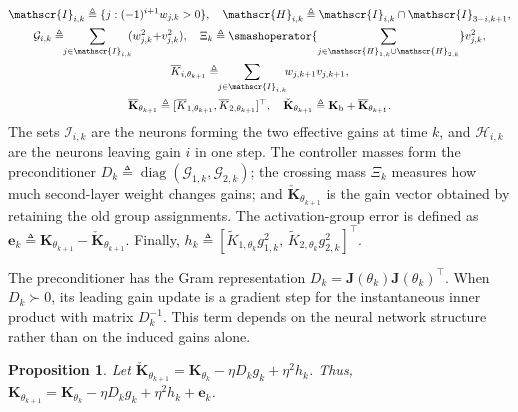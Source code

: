 \documentclass[letterpaper, 10 pt, conference]{ieeeconf}
\newcommand{\be}{\mathbf{e}}
\newcommand{\bJ}{\mathbf{J}}
\newcommand{\bK}{\mathbf{K}}
\newcommand{\cG}{\mathcal{G}}
\newcommand{\sI}{\mathscr{I}}
\newcommand{\sH}{\mathscr{H}}
\newtheorem{proposition}{Proposition}
\DeclareMathOperator*{\diag}{diag}
\begin{document}
\begin{gather} \label{eq_weight_defs}
    \sI_{i,k} \triangleq \{j : (-1)^{i+1}w_{j,k} > 0\},
    \quad
    \sH_{i,k} \triangleq \sI_{i,k} \cap \sI_{3-i,k+1},
    \\
    \cG_{i,k} \triangleq \!\!\sum_{j\in\sI_{i,k}}\!\! (w_{j,k}^{2}{+}v_{j,k}^{2}),
    \quad
    \Xi_{k} \triangleq \smashoperator{\sum_{j\in\sH_{1,k}\cup\sH_{2,k}}} v_{j,k}^{2},
    \\
    \overline{K}_{i,\theta_{k+1}} \triangleq \!\!\sum_{j\in\sI_{i,k}}\!\! w_{j,k+1}v_{j,k+1},
    \\
\overline{\bK}_{\theta_{k+1}}\triangleq
    [\overline K_{1,\theta_{k+1}},\overline K_{2,\theta_{k+1}}]^{\top},  \quad
    \check{\bK}_{\theta_{k+1}} \triangleq \bK_{\mathrm b} + \overline{\bK}_{\theta_{k+1}}.
\end{gather}
The sets $\sI_{i,k}$ are the neurons forming the two effective gains at time $k$, and $\sH_{i,k}$ are the neurons leaving gain $i$ in one step. The controller masses form the preconditioner $D_{k} \triangleq \diag(\cG_{1,k},\cG_{2,k})$; the crossing mass $\Xi_{k}$ measures how much second-layer weight changes gains; and $\check{\bK}_{\theta_{k+1}}$ is the gain vector obtained by retaining the old group assignments. The activation-group error is defined as $\be_{k} \triangleq \bK_{\theta_{k+1}} - \check{\bK}_{\theta_{k+1}}$. Finally, $h_{k} \triangleq [\widetilde{K}_{1,\theta_{k}} g_{1,k}^{2},\, \widetilde{K}_{2,\theta_{k}} g_{2,k}^{2}]^{\top}$.

The preconditioner has the Gram representation
$D_k=\bJ(\theta_k)\bJ(\theta_k)^\top$.
When $D_k\succ0$, its leading gain update is a gradient step for the
instantaneous inner product with matrix $D_k^{-1}$.
This term depends on the neural network structure rather than on the
induced gains alone.

\begin{proposition}\label{proposition_approx_update}
    Let $\check{\bK}_{\theta_{k+1}} = \bK_{\theta_k} - \eta D_{k} g_{k} + \eta^{2} h_{k}$. Thus, $\bK_{\theta_{k+1}} = \bK_{\theta_k} - \eta D_{k} g_{k} + \eta^{2} h_{k} + \be_{k}$.
\end{proposition}
 
\end{document}
